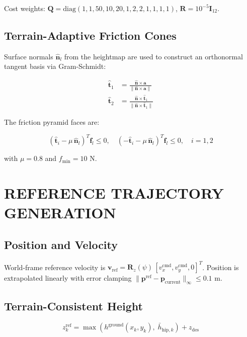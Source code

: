 \documentclass[11pt,a4paper]{article}
\begin{document}
Cost weights: $\mathbf{Q} = \text{diag}(1, 1, 50, 10, 20, 1, 2, 2, 1, 1, 1, 1)$, $\mathbf{R} = 10^{-5}\mathbf{I}_{12}$.

\subsection{Terrain-Adaptive Friction Cones}

Surface normals $\hat{\mathbf{n}}_l$ from the heightmap are used to construct an orthonormal tangent basis via Gram-Schmidt:

\begin{align}
\hat{\mathbf{t}}_1 &= \frac{\hat{\mathbf{n}} \times \mathbf{a}}{\|\hat{\mathbf{n}} \times \mathbf{a}\|} \\
\hat{\mathbf{t}}_2 &= \frac{\hat{\mathbf{n}} \times \hat{\mathbf{t}}_1}{\|\hat{\mathbf{n}} \times \hat{\mathbf{t}}_1\|}
\end{align}

The friction pyramid faces are:

\begin{equation}
(\hat{\mathbf{t}}_i - \mu\,\hat{\mathbf{n}}_l)^T \mathbf{f}_l \leq 0, \quad (-\hat{\mathbf{t}}_i - \mu\,\hat{\mathbf{n}}_l)^T \mathbf{f}_l \leq 0, \quad i = 1, 2
\end{equation}

with $\mu = 0.8$ and $f_{\min} = 10$ N.

\section{REFERENCE TRAJECTORY GENERATION}

\subsection{Position and Velocity}

World-frame reference velocity is $\mathbf{v}_{\text{ref}} = \mathbf{R}_z(\psi)\,[v_x^{\text{cmd}}, v_y^{\text{cmd}}, 0]^T$. Position is extrapolated linearly with error clamping $\|\mathbf{p}^{\text{ref}} - \mathbf{p}_{\text{current}}\|_\infty \leq 0.1$ m.

\subsection{Terrain-Consistent Height}

\begin{equation}
z_k^{\text{ref}} = \max\!\left(h^{\text{ground}}(x_k, y_k),\; \bar{h}_{\text{hip},k}\right) + z_{\text{des}}
\end{equation}
\end{document}

